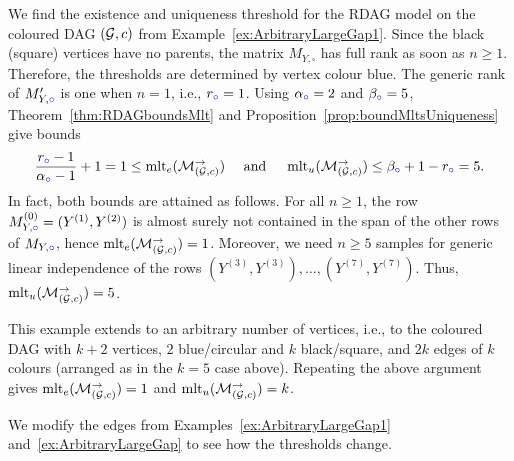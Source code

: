 \begin{example} \label{ex:ArbitraryLargeGap}
	We find the existence and uniqueness threshold for the RDAG model on the coloured DAG $(\mathcal{G}, c)$ from Example~\ref{ex:ArbitraryLargeGap1}. 
	Since the black (square) vertices have no parents, the matrix $M_{Y, \square}$ has full rank as soon as $n \geq 1$.
	Therefore, the thresholds are determined by vertex colour blue. The generic rank of $M'_{Y,{\color{blue}\circ}}$ is one when $n=1$, i.e., $r_{\color{blue}\circ} = 1$. Using $\alpha_{\color{blue}\circ} = 2$ and $\beta_{\color{blue}\circ} = 5$, Theorem~\ref{thm:RDAGboundsMlt} and Proposition~\ref{prop:boundMltsUniqueness} give bounds
	\begin{align*}
		\frac{r_{\color{blue}\circ}-1}{\alpha_{\color{blue}\circ}-1} + 1 = 1 \leq \operatorname{mlt}_e(\mathcal{M}_{(\mathcal{G}, c)}^{\to})
		\quad \text{ and } \quad
		\operatorname{mlt}_u(\mathcal{M}_{(\mathcal{G}, c)}^{\to}) \leq \beta_{\color{blue}\circ} + 1 - r_{\color{blue}\circ} = 5.
	\end{align*}
	In fact, both bounds are attained as follows. For all $n \geq 1$, the row $M_{Y,{\color{blue}\circ}}^{(0)} = (Y^{(1)}, Y^{(2)})$ is almost surely not contained in the span of the other rows of $M_{Y,{\color{blue}\circ}}$, hence $\operatorname{mlt}_e(\mathcal{M}_{(\mathcal{G}, c)}^{\to}) = 1$. Moreover, we need $n \geq 5$ samples for generic linear independence of the rows $(Y^{(3)}, Y^{(3)}), \ldots, (Y^{(7)}, Y^{(7)})$. Thus, $\operatorname{mlt}_u(\mathcal{M}_{(\mathcal{G}, c)}^{\to}) = 5$.
	
	This example extends to an arbitrary number of vertices, i.e., to the coloured DAG with $k+2$ vertices, $2$ blue/circular and $k$ black/square, and $2k$ edges of $k$ colours (arranged as in the $k=5$ case above).
	Repeating the above argument gives $\operatorname{mlt}_e(\mathcal{M}_{(\mathcal{G}, c)}^{\to}) = 1$ and $\operatorname{mlt}_u(\mathcal{M}_{(\mathcal{G}, c)}^{\to}) = k$.
	\hfill\exSymbol
\end{example}

We modify the edges from Examples~\ref{ex:ArbitraryLargeGap1} and~\ref{ex:ArbitraryLargeGap} to see how the thresholds change.

